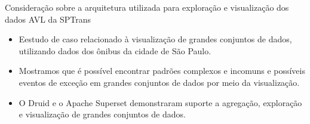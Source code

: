\documentclass{beamer}
\begin{document}
\begin{frame}{Consideração sobre a arquitetura utilizada para exploração e visualização dos dados AVL da SPTrans}
\begin{itemize}
    \item Eestudo de caso relacionado à visualização de grandes conjuntos de dados, utilizando dados dos ônibus da cidade de São Paulo. 
    \item Mostramos que é possível encontrar padrões complexos e incomuns e possíveis eventos de exceção em grandes conjuntos de dados por meio da visualização. 
    \item O Druid e o Apache Superset demonstraram suporte a agregação, exploração e visualização de grandes conjuntos de dados.
\end{itemize}
\end{frame}
\end{document}
